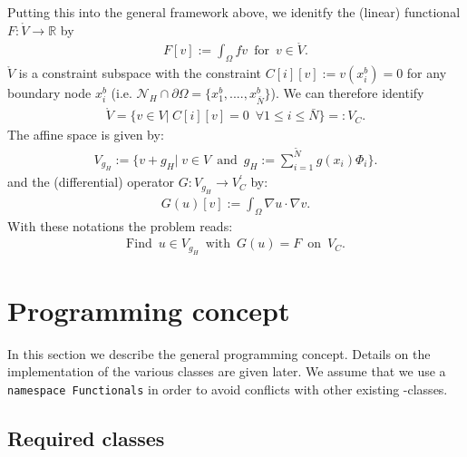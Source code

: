 \documentclass[a4paper,11pt]{article}
\numberwithin{equation}{section}
\begin{document}
  Putting this into the general framework above, we idenitfy the (linear) functional $F:\mathring{V}\rightarrow \mathbb{R}$ by
  \begin{align*}
  F[v] := \int_{\Omega} f v \enspace \mbox{for} \enspace v \in \mathring{V}.
  \end{align*}
  $\mathring{V}$ is a constraint subspace with the constraint $C[i][v] := v(x_i^b) = 0$ for any boundary node $x_i^b$ (i.e. $\mathcal{N}_H \cap \partial \Omega = \{ x_1^b, ...., x_{\bar{N}}^b\}$). We can therefore identify
  \begin{align*}
  \mathring{V} = \{ v \in V| \hspace{3pt} C[i][v] = 0 \enspace \forall 1\le i\le \bar{N} \} =: V_C.
  \end{align*}
  The affine space is given by:
  \begin{align*}
  V_{g_H} := \{ v + g_H | \hspace{3pt} v \in V \enspace \mbox{and} \enspace g_H := \sum_{i=1}^{\tilde{N}} g(x_i) \Phi_i \}.
  \end{align*}
  and the (differential) operator $G : V_{g_H} \rightarrow V_C^{\prime}$ by:
  \begin{align*}
  G(u)[v] := \int_{\Omega} \nabla u \cdot \nabla v.
  \end{align*}
  With these notations the problem reads:
  \begin{align*}
  \mbox{Find} \enspace u \in V_{g_H} \enspace \mbox{with} \enspace G(u) = F \enspace \mbox{on} \enspace V_C.
  \end{align*}

\section{Programming concept}

In this section we describe the general programming concept. Details on the implementation of the various classes are given later. We assume that we use a {\tt namespace Functionals} in order to avoid conflicts with other existing \dunefem-classes.

\subsection{Required classes}
\end{document}
